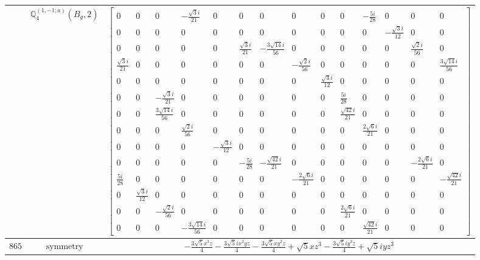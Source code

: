 \documentclass[fleqn,8pt,landscape]{jsarticle}
\begin{document}
\begin{longtable}{ccc}
$  $ & $ \mathbb{Q}_{4}^{(1,-1;a)}(B_{g},2) $ & $ \begin{bmatrix} 0 & 0 & 0 & - \frac{\sqrt{3} i}{21} & 0 & 0 & 0 & 0 & 0 & 0 & - \frac{5 i}{28} & 0 & 0 & 0 \\ 0 & 0 & 0 & 0 & 0 & 0 & 0 & 0 & 0 & 0 & 0 & - \frac{\sqrt{3} i}{12} & 0 & 0 \\ 0 & 0 & 0 & 0 & 0 & \frac{\sqrt{3} i}{21} & - \frac{3 \sqrt{14} i}{56} & 0 & 0 & 0 & 0 & 0 & \frac{\sqrt{2} i}{56} & 0 \\ \frac{\sqrt{3} i}{21} & 0 & 0 & 0 & 0 & 0 & 0 & - \frac{\sqrt{2} i}{56} & 0 & 0 & 0 & 0 & 0 & \frac{3 \sqrt{14} i}{56} \\ 0 & 0 & 0 & 0 & 0 & 0 & 0 & 0 & \frac{\sqrt{3} i}{12} & 0 & 0 & 0 & 0 & 0 \\ 0 & 0 & - \frac{\sqrt{3} i}{21} & 0 & 0 & 0 & 0 & 0 & 0 & \frac{5 i}{28} & 0 & 0 & 0 & 0 \\ 0 & 0 & \frac{3 \sqrt{14} i}{56} & 0 & 0 & 0 & 0 & 0 & 0 & \frac{\sqrt{42} i}{21} & 0 & 0 & 0 & 0 \\ 0 & 0 & 0 & \frac{\sqrt{2} i}{56} & 0 & 0 & 0 & 0 & 0 & 0 & \frac{2 \sqrt{6} i}{21} & 0 & 0 & 0 \\ 0 & 0 & 0 & 0 & - \frac{\sqrt{3} i}{12} & 0 & 0 & 0 & 0 & 0 & 0 & 0 & 0 & 0 \\ 0 & 0 & 0 & 0 & 0 & - \frac{5 i}{28} & - \frac{\sqrt{42} i}{21} & 0 & 0 & 0 & 0 & 0 & - \frac{2 \sqrt{6} i}{21} & 0 \\ \frac{5 i}{28} & 0 & 0 & 0 & 0 & 0 & 0 & - \frac{2 \sqrt{6} i}{21} & 0 & 0 & 0 & 0 & 0 & - \frac{\sqrt{42} i}{21} \\ 0 & \frac{\sqrt{3} i}{12} & 0 & 0 & 0 & 0 & 0 & 0 & 0 & 0 & 0 & 0 & 0 & 0 \\ 0 & 0 & - \frac{\sqrt{2} i}{56} & 0 & 0 & 0 & 0 & 0 & 0 & \frac{2 \sqrt{6} i}{21} & 0 & 0 & 0 & 0 \\ 0 & 0 & 0 & - \frac{3 \sqrt{14} i}{56} & 0 & 0 & 0 & 0 & 0 & 0 & \frac{\sqrt{42} i}{21} & 0 & 0 & 0 \end{bmatrix} $ \\ \hline
$ 865 $ & $ \text{symmetry} $ & $ - \frac{3 \sqrt{5} x^{3} z}{4} - \frac{3 \sqrt{5} i x^{2} y z}{4} - \frac{3 \sqrt{5} x y^{2} z}{4} + \sqrt{5} x z^{3} - \frac{3 \sqrt{5} i y^{3} z}{4} + \sqrt{5} i y z^{3} $ \\

\end{longtable}
\end{document}
